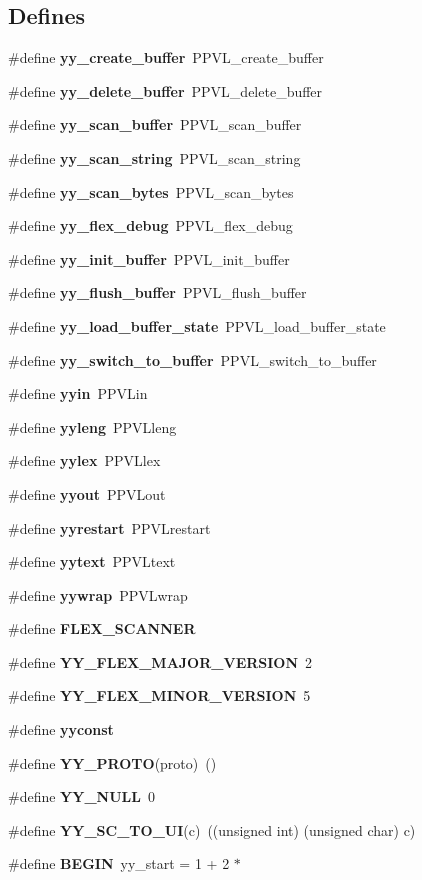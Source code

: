 \subsection*{Defines}
\begin{CompactItemize}
\item 
\#define {\bf yy\_\-create\_\-buffer}\ PPVL\_\-create\_\-buffer
\item 
\#define {\bf yy\_\-delete\_\-buffer}\ PPVL\_\-delete\_\-buffer
\item 
\#define {\bf yy\_\-scan\_\-buffer}\ PPVL\_\-scan\_\-buffer
\item 
\#define {\bf yy\_\-scan\_\-string}\ PPVL\_\-scan\_\-string
\item 
\#define {\bf yy\_\-scan\_\-bytes}\ PPVL\_\-scan\_\-bytes
\item 
\#define {\bf yy\_\-flex\_\-debug}\ PPVL\_\-flex\_\-debug
\item 
\#define {\bf yy\_\-init\_\-buffer}\ PPVL\_\-init\_\-buffer
\item 
\#define {\bf yy\_\-flush\_\-buffer}\ PPVL\_\-flush\_\-buffer
\item 
\#define {\bf yy\_\-load\_\-buffer\_\-state}\ PPVL\_\-load\_\-buffer\_\-state
\item 
\#define {\bf yy\_\-switch\_\-to\_\-buffer}\ PPVL\_\-switch\_\-to\_\-buffer
\item 
\#define {\bf yyin}\ PPVLin
\item 
\#define {\bf yyleng}\ PPVLleng
\item 
\#define {\bf yylex}\ PPVLlex
\item 
\#define {\bf yyout}\ PPVLout
\item 
\#define {\bf yyrestart}\ PPVLrestart
\item 
\#define {\bf yytext}\ PPVLtext
\item 
\#define {\bf yywrap}\ PPVLwrap
\item 
\#define {\bf FLEX\_\-SCANNER}
\item 
\#define {\bf YY\_\-FLEX\_\-MAJOR\_\-VERSION}\ 2
\item 
\#define {\bf YY\_\-FLEX\_\-MINOR\_\-VERSION}\ 5
\item 
\#define {\bf yyconst}
\item 
\#define {\bf YY\_\-PROTO}(proto)\ ()
\item 
\#define {\bf YY\_\-NULL}\ 0
\item 
\#define {\bf YY\_\-SC\_\-TO\_\-UI}(c)\ ((unsigned int) (unsigned char) c)
\item 
\#define {\bf BEGIN}\ yy\_\-start = 1 + 2 $\ast$

\end{CompactItemize}
